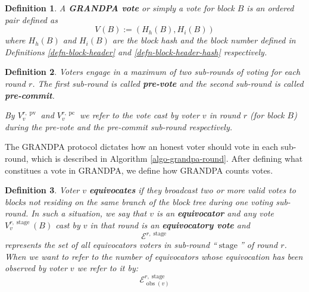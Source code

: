 \documentclass{book}
\newcommand{\assign}{:=}
\newcommand{\nosymbol}{}
\newcommand{\tmop}[1]{\ensuremath{\operatorname{#1}}}
\newcommand{\tmstrong}[1]{\textbf{#1}}
\newcommand{\tmtextbf}[1]{{\bfseries{#1}}}
\newcommand{\tmtexttt}[1]{{\ttfamily{#1}}}
\newcommand{\tmverbatim}[1]{{\ttfamily{#1}}}
\newtheorem{definition}{Definition}
\providecommand{\nosymbol}{}
\providecommand{\tmop}[1]{\ensuremath{\mathrm{#1}}}
\providecommand{\tmstrong}[1]{\tmtextbf{#1}}
\providecommand{\tmtextbf}[1]{\tmtextbf{#1}}
\providecommand{\tmverbatim}[1]{\tmtexttt{#1}}
\newtheorem{definition}{Definition}
\begin{document}
\begin{definition}
  \label{defn-vote}A {\tmstrong{GRANDPA vote }}or simply a vote for block $B$
  is an ordered pair defined as
  \[ V_{\nosymbol} (B) \assign (H_h (B), H_i (B)) \]
  where $H_h (B)$ and $H_i (B)$ are the block hash and the block number
  defined in Definitions \ref{defn-block-header} and
  \ref{defn-block-header-hash} respectively.
\end{definition}

\begin{definition}
  Voters engage in a maximum of two sub-rounds of voting for each round $r$.
  The first sub-round is called {\tmstrong{pre-vote}} and\tmverbatim{} the
  second sub-round is called {\tmstrong{pre-commit}}.
  
  By {\tmstrong{$V_v^{r, \tmop{pv}}$}} and {\tmstrong{$V_v^{r, \tmop{pc}}$}}
  we refer to the vote cast by voter $v$ in round $r$ (for block $B$) during
  the pre-vote and the pre-commit sub-round respectively.
\end{definition}

The GRANDPA protocol dictates how an honest voter should vote in each
sub-round, which is described in Algorithm \ref{algo-grandpa-round}. After
defining what constitues a vote in GRANDPA, we define how GRANDPA counts
votes.

\begin{definition}
  Voter $v$ {\tmstrong{equivocates}} if they broadcast two or more valid votes
  to blocks not residing on the same branch of the block tree during one
  voting sub-round. In such a situation, we say that $v$ is an
  {\tmstrong{equivocator}} and any vote $V_v^{r, \tmop{stage}} (B)$ cast by
  $v$ in that round is an {\tmstrong{equivocatory vote}} and
  \[ \mathcal{E}^{r, \tmop{stage}} \]
  represents the set of all equivocators voters in sub-round
  ``$\tmop{stage}$'' of round $r$. When we want to refer to the number
  of\tmverbatim{} equivocators whose equivocation has been observed by voter
  $v$ we refer to it by:
  \[ \mathcal{E}^{r, \tmop{stage}}_{\tmop{obs} (v)} \]
  
\end{definition}
\end{document}
